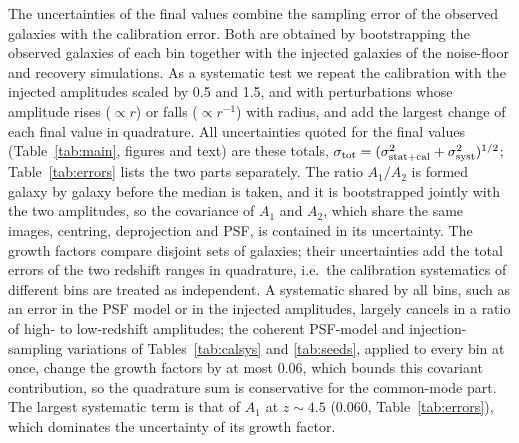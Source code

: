 \documentclass[fleqn,usenatbib]{mnras}
\begin{document}
The uncertainties of the final values combine the sampling error of the
observed galaxies with the calibration error. Both are obtained by bootstrapping
the observed galaxies of each bin together with the injected galaxies of the
noise-floor and recovery simulations. As a systematic test we repeat the
calibration with the injected amplitudes scaled by 0.5 and 1.5, and with
perturbations whose amplitude rises ($\propto r$) or falls ($\propto r^{-1}$)
with radius, and add the largest change of each final value in quadrature. All
uncertainties quoted for the final values (Table~\ref{tab:main}, figures and
text) are these totals,
$\sigma_{\rm tot}=(\sigma_{\rm stat+cal}^2+\sigma_{\rm syst}^2)^{1/2}$;
Table~\ref{tab:errors} lists the two parts separately. The ratio $A_1/A_2$ is
formed galaxy by galaxy before the median is taken, and it is bootstrapped
jointly with the two amplitudes, so the covariance of $A_1$ and $A_2$, which
share the same images, centring, deprojection and PSF, is contained in its
uncertainty. The growth factors compare disjoint sets of galaxies; their
uncertainties add the total errors of the two redshift ranges in quadrature,
i.e.\ the calibration systematics of different bins are treated as independent.
A systematic shared by all bins, such as an error in the PSF model or in the
injected amplitudes, largely cancels in a ratio of high- to low-redshift
amplitudes; the coherent PSF-model and injection-sampling variations of
Tables~\ref{tab:calsys} and \ref{tab:seeds}, applied to every bin at once, change
the growth factors by at most 0.06, which bounds this covariant contribution, so
the quadrature sum is conservative for the common-mode part.
The largest systematic term is that of $A_1$ at $z\sim4.5$ (0.060,
Table~\ref{tab:errors}), which dominates the uncertainty of its growth factor.
\end{document}
